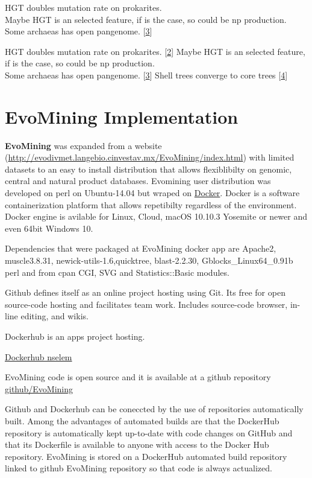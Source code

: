\documentclass[12pt,twoside]{reedthesis}
\begin{document}
  HGT doubles mutation rate on prokarites.\\
  Maybe HGT is an selected feature, if is the case, so could be np
  production.\\
  Some archaeas has open pangenome.
  {[}\protect\hyperlink{ref-halachev_calculating_2011}{3}{]}
  
  HGT doubles mutation rate on prokarites.
  {[}\protect\hyperlink{ref-koonin_turbulent_2015}{2}{]} Maybe HGT is an
  selected feature, if is the case, so could be np production.\\
  Some archaeas has open pangenome.
  {[}\protect\hyperlink{ref-halachev_calculating_2011}{3}{]} Shell trees
  converge to core trees
  {[}\protect\hyperlink{ref-narechania_random_2012}{4}{]}
  
  \section{EvoMining Implementation}\label{evomining-implementation}
  
  \textbf{EvoMining} was expanded from a website
  (\url{http://evodivmet.langebio.cinvestav.mx/EvoMining/index.html}) with
  limited datasets to an easy to install distribution that allows
  flexiblibilty on genomic, central and natural product databases.
  Evomining user distribution was developed on perl on Ubuntu-14.04 but
  wraped on \href{https://www.docker.com/}{Docker}. Docker is a software
  containerization platform that allows repetibilty regardless of the
  environment. Docker engine is avilable for Linux, Cloud, macOS 10.10.3
  Yosemite or newer and even 64bit Windows 10.
  
  Dependencies that were packaged at EvoMining docker app are Apache2,
  muscle3.8.31, newick-utils-1.6,quicktree, blast-2.2.30,
  Gblocks\_Linux64\_0.91b perl and from cpan CGI, SVG and
  Statistics::Basic modules.
  
  Github defines itself as an online project hosting using Git. Its free
  for open source-code hosting and facilitates team work. Includes
  source-code browser, in-line editing, and wikis.
  
  Dockerhub is an apps project hosting.
  
  \href{https://hub.docker.com/u/nselem/}{Dockerhub nselem}
  
  EvoMining code is open source and it is available at a github repository
  \href{https://github.com/nselem/EvoMining}{github/EvoMining}
  
  Github and Dockerhub can be coneccted by the use of repositories
  automatically built. Among the advantages of automated builds are that
  the DockerHub repository is automatically kept up-to-date with code
  changes on GitHub and that its Dockerfile is available to anyone with
  access to the Docker Hub repository. EvoMining is stored on a DockerHub
  automated build repository linked to github EvoMining repository so that
  code is always actualized.
  
\end{document}
